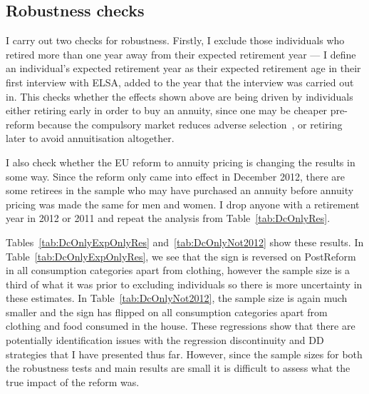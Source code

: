 \documentclass[12pt]{article}
\begin{document}
\begin{landscape}
  \linespread{1}
  
\end{landscape}
\begin{landscape}
  \linespread{1}
  
\end{landscape}

\begin{landscape}
  \linespread{1}
  
\end{landscape}

\subsection{Robustness checks}

I carry out two checks for robustness. Firstly, I exclude those individuals who
retired more than one year away from their expected retirement year --- I define
an individual's expected retirement year as their expected retirement age in
their first interview with ELSA, added to the year that the interview was
carried out in. This checks whether the effects shown above are being driven by
individuals either retiring early in order to buy an annuity, since one may be
cheaper pre-reform because the compulsory market reduces adverse selection~\cite{finkelstein-porteba-2002}, or retiring later to avoid annuitisation
altogether.

I also check whether the EU reform to annuity pricing is changing the results in
some way. Since the reform only came into effect in December 2012, there are some
retirees in the sample who may have purchased an annuity before
annuity pricing was made the same for men and women. I drop anyone with a
retirement year in 2012 or 2011 and repeat the analysis from Table~\ref{tab:DcOnlyRes}.

Tables~\ref{tab:DcOnlyExpOnlyRes} and~\ref{tab:DcOnlyNot2012} show these
results. In Table~\ref{tab:DcOnlyExpOnlyRes}, we see that the sign is reversed on
PostReform in all consumption categories apart from clothing, however the sample
size is a third of what it was prior to excluding individuals so there is more
uncertainty in these estimates. In Table~\ref{tab:DcOnlyNot2012}, the sample
size is again much smaller and the sign has flipped on all consumption
categories apart from clothing and food consumed in the house. These regressions
show that there are potentially identification issues with the regression
discontinuity and DD strategies that I have presented thus far. However, since
the sample sizes for both the robustness tests and main results are small it is
difficult to assess what the true impact of the reform was.
\end{document}
